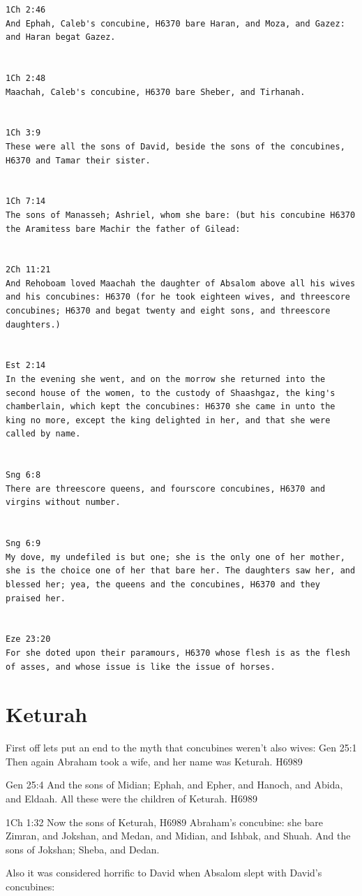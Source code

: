 \documentclass[11pt]{article}
\begin{document}
{\begin{lstlisting}
1Ch 2:46
And Ephah, Caleb's concubine, H6370 bare Haran, and Moza, and Gazez: and Haran begat Gazez.


1Ch 2:48
Maachah, Caleb's concubine, H6370 bare Sheber, and Tirhanah.


1Ch 3:9
These were all the sons of David, beside the sons of the concubines, H6370 and Tamar their sister.


1Ch 7:14
The sons of Manasseh; Ashriel, whom she bare: (but his concubine H6370 the Aramitess bare Machir the father of Gilead:


2Ch 11:21
And Rehoboam loved Maachah the daughter of Absalom above all his wives and his concubines: H6370 (for he took eighteen wives, and threescore concubines; H6370 and begat twenty and eight sons, and threescore daughters.)


Est 2:14
In the evening she went, and on the morrow she returned into the second house of the women, to the custody of Shaashgaz, the king's chamberlain, which kept the concubines: H6370 she came in unto the king no more, except the king delighted in her, and that she were called by name.


Sng 6:8
There are threescore queens, and fourscore concubines, H6370 and virgins without number.


Sng 6:9
My dove, my undefiled is but one; she is the only one of her mother, she is the choice one of her that bare her. The daughters saw her, and blessed her; yea, the queens and the concubines, H6370 and they praised her.


Eze 23:20
For she doted upon their paramours, H6370 whose flesh is as the flesh of asses, and whose issue is like the issue of horses.
\end{lstlisting}

\section{Keturah}
First off lets put an end to the myth that concubines weren't also wives:
Gen 25:1
Then again Abraham took a wife, and her name was Keturah. H6989

Gen 25:4
And the sons of Midian; Ephah, and Epher, and Hanoch, and Abida, and Eldaah. All these were the children of Keturah. H6989

1Ch 1:32
Now the sons of Keturah, H6989 Abraham's concubine: she bare Zimran, and Jokshan, and Medan, and Midian, and Ishbak, and Shuah. And the sons of Jokshan; Sheba, and Dedan.

Also it was considered horrific to David when Absalom slept with David's concubines:

}
\end{document}
